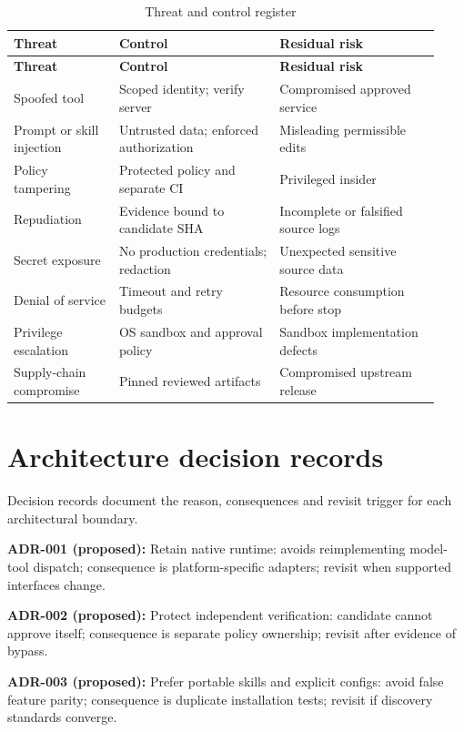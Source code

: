 \documentclass[11pt,letterpaper]{article}
\begin{document}
\begin{longtable}{@{}>{\raggedright\arraybackslash}p{0.23\linewidth}>{\raggedright\arraybackslash}p{0.35\linewidth}>{\raggedright\arraybackslash}p{0.35\linewidth}@{}}
\caption{Threat and control register}\\\toprule
\textbf{Threat} & \textbf{Control} & \textbf{Residual risk}\\\midrule\endfirsthead\toprule
\textbf{Threat} & \textbf{Control} & \textbf{Residual risk}\\\midrule\endhead\bottomrule\endfoot
Spoofed tool & Scoped identity; verify server & Compromised approved service\\
Prompt or skill injection & Untrusted data; enforced authorization & Misleading permissible edits\\
Policy tampering & Protected policy and separate CI & Privileged insider\\
Repudiation & Evidence bound to candidate SHA & Incomplete or falsified source logs\\
Secret exposure & No production credentials; redaction & Unexpected sensitive source data\\
Denial of service & Timeout and retry budgets & Resource consumption before stop\\
Privilege escalation & OS sandbox and approval policy & Sandbox implementation defects\\
Supply-chain compromise & Pinned reviewed artifacts & Compromised upstream release\\
\end{longtable}
\clearpage\section{Architecture decision records}
Decision records document the reason, consequences and revisit trigger for each architectural boundary.

\textbf{ADR-001 (proposed):} Retain native runtime: avoids reimplementing model-tool dispatch; consequence is platform-specific adapters; revisit when supported interfaces change.

\textbf{ADR-002 (proposed):} Protect independent verification: candidate cannot approve itself; consequence is separate policy ownership; revisit after evidence of bypass.

\textbf{ADR-003 (proposed):} Prefer portable skills and explicit configs: avoid false feature parity; consequence is duplicate installation tests; revisit if discovery standards converge.
\end{document}
